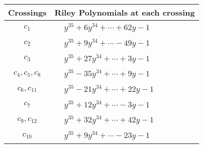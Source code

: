 \documentclass[1p]{elsarticle_modified}
\theoremstyle{definition}
\begin{document}
\begin{tabular}{m{50pt}|m{274pt}}
Crossings & \hspace{64pt}Riley Polynomials at each crossing \\
\hline $$\begin{aligned}c_{1}\end{aligned}$$&$\begin{aligned}
&y^{35}+6 y^{34}+\cdots+62 y-1
\end{aligned}$\\
\hline $$\begin{aligned}c_{2}\end{aligned}$$&$\begin{aligned}
&y^{35}+9 y^{34}+\cdots-49 y-1
\end{aligned}$\\
\hline $$\begin{aligned}c_{3}\end{aligned}$$&$\begin{aligned}
&y^{35}+27 y^{34}+\cdots+3 y-1
\end{aligned}$\\
\hline $$\begin{aligned}c_{4},c_{5},c_{8}\end{aligned}$$&$\begin{aligned}
&y^{35}-35 y^{34}+\cdots+9 y-1
\end{aligned}$\\
\hline $$\begin{aligned}c_{6},c_{11}\end{aligned}$$&$\begin{aligned}
&y^{35}-21 y^{34}+\cdots+22 y-1
\end{aligned}$\\
\hline $$\begin{aligned}c_{7}\end{aligned}$$&$\begin{aligned}
&y^{35}+12 y^{34}+\cdots-3 y-1
\end{aligned}$\\
\hline $$\begin{aligned}c_{9},c_{12}\end{aligned}$$&$\begin{aligned}
&y^{35}+32 y^{34}+\cdots+42 y-1
\end{aligned}$\\
\hline $$\begin{aligned}c_{10}\end{aligned}$$&$\begin{aligned}
&y^{35}+9 y^{34}+\cdots-23 y-1
\end{aligned}$\\
\hline
\end{tabular}\\~\\
\end{document}
